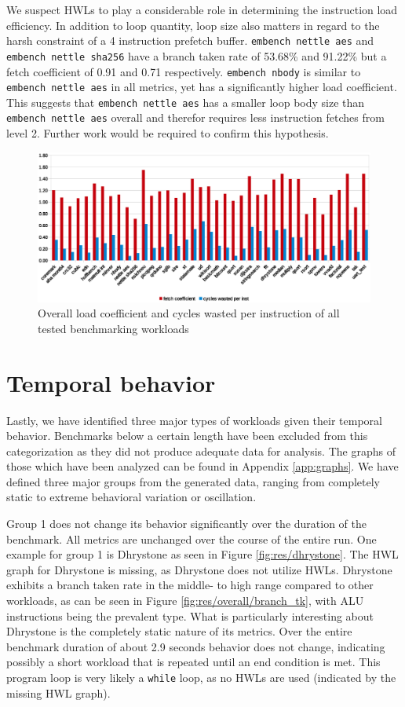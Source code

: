 \documentclass[../bachelor_paper.tex]{subfiles}
\begin{document}
We suspect \acp{HWL} to play a considerable role in determining the instruction load efficiency. In addition to loop quantity, loop size also matters in regard to the harsh constraint of a 4 instruction prefetch buffer. \texttt{embench nettle aes} and \texttt{embench nettle sha256} have a branch taken rate of 53.68\% and 91.22\% but a fetch coefficient of 0.91 and 0.71 respectively. \texttt{embench nbody} is similar to \texttt{embench nettle aes} in all metrics, yet has a significantly higher load coefficient. This suggests that \texttt{embench nettle aes} has a smaller loop body size than \texttt{embench nettle aes} overall and therefor requires less instruction fetches from level 2. Further work would be required to confirm this hypothesis.

\begin{figure}
    \centering
    \includegraphics[width=\textwidth]{img/graph/overall_fetch_waste.eps}
    \caption{Overall load coefficient and cycles wasted per instruction of all tested benchmarking workloads}
    \label{fig:res/overall/fetch_waste}
\end{figure}

\section{Temporal behavior}
Lastly, we have identified three major types of workloads given their temporal behavior. Benchmarks below a certain length have been excluded from this categorization as they did not produce adequate data for analysis. The graphs of those which have been analyzed can be found in Appendix \ref{app:graphs}. We have defined three major groups from the generated data, ranging from completely static to extreme behavioral variation or oscillation.

Group 1 does not change its behavior significantly over the duration of the benchmark. All metrics are unchanged over the course of the entire run. One example for group 1 is Dhrystone as seen in Figure \ref{fig:res/dhrystone}. The \ac{HWL} graph for Dhrystone is missing, as Dhrystone does not utilize \acp{HWL}. Dhrystone exhibits a branch taken rate in the middle- to high range compared to other workloads, as can be seen in Figure \ref{fig:res/overall/branch_tk}, with \ac{ALU} instructions being the prevalent type. What is particularly interesting about Dhrystone is the completely static nature of its metrics. Over the entire benchmark duration of about 2.9 seconds behavior does not change, indicating possibly a short workload that is repeated until an end condition is met. This program loop is very likely a \texttt{while} loop, as no \acp{HWL} are used (indicated by the missing \ac{HWL} graph).
\end{document}
